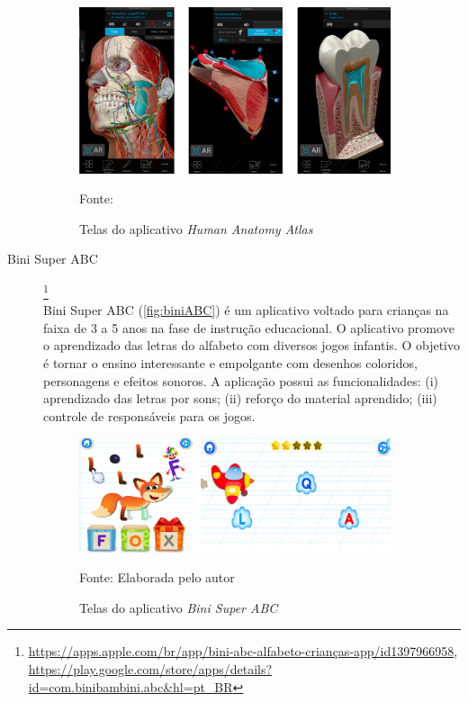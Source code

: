 \begin{description}
\begin{figure}[ht!]
\centering
    \caption{Telas do aplicativo \textit{Human Anatomy Atlas}}
    \label{fig:humAtlas}
    \includegraphics[width=0.9\textwidth]{Figuras/humanAtlas.png}
    
    Fonte: \cite{HumanAnatomyAtlas}
\end{figure}

\item[Bini Super ABC]\footnote{\url{https://apps.apple.com/br/app/bini-abc-alfabeto-crianças-app/id1397966958}, \url{https://play.google.com/store/apps/details?id=com.binibambini.abc&hl=pt_BR}} \hfill \\
Bini Super ABC (\autoref{fig:biniABC}) é um aplicativo voltado para crianças na faixa de 3 a 5 anos na fase de instrução educacional. O aplicativo promove o aprendizado das letras do alfabeto com diversos jogos infantis. O objetivo é tornar o ensino interessante e empolgante com desenhos coloridos, personagens e efeitos sonoros. A aplicação possui as funcionalidades: (i) aprendizado das letras por sons; (ii) reforço do material aprendido; (iii) controle de responsáveis para os jogos.

\begin{figure}[H]
\centering
    \caption{Telas do aplicativo \textit{Bini Super ABC}}
    \label{fig:biniABC}
    \includegraphics[width=0.9\textwidth]{Figuras/biniabc.png}
    
    Fonte: Elaborada pelo autor
\end{figure}


\end{description}
